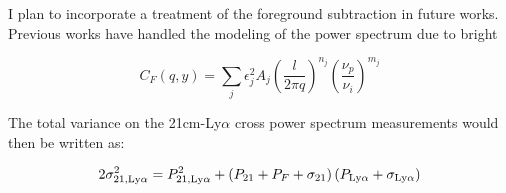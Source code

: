 I plan to incorporate a treatment of the foreground subtraction in future works.
Previous works have handled the modeling of the power spectrum due to bright

\begin{equation}
    C_F \left(q, y\right) = \sum_{j} \epsilon_j^2 A_j \left( \frac{l}{2 \pi q} \right)^{n_j} \left( \frac{\nu_p}{\nu_i}\right)^{m_j}
\end{equation}

The total variance on the 21cm-Ly$\alpha$ cross power spectrum measurements would
then be written as:

\begin{equation}
    2 \sigma^2_{21, \rm Ly\alpha} = P^2_{21, \rm Ly\alpha} +
      \left(P_{21} + P_{F} + \sigma_{21} \right) \left( P_{\rm Ly\alpha} + \sigma_{\rm Ly\alpha}\right)
\end{equation}
